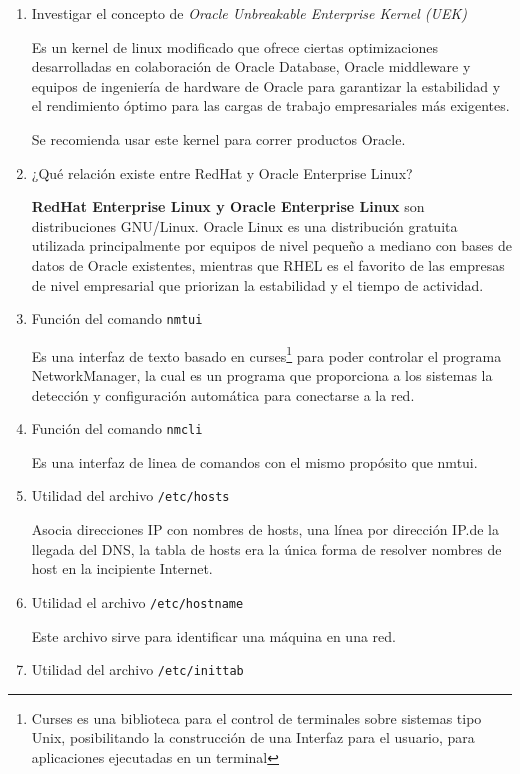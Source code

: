 \documentclass[../main.tex]{subfiles}
\begin{document}
\begin{enumerate}
  \item Investigar el concepto de \textit{Oracle Unbreakable Enterprise Kernel (UEK)}

        Es un kernel de linux modificado que ofrece ciertas optimizaciones desarrolladas
        en colaboración de Oracle Database, Oracle middleware y equipos de ingeniería de
        hardware de Oracle para garantizar la estabilidad y el rendimiento óptimo para
        las cargas de trabajo empresariales más exigentes\cite{oracle2021}.

        Se recomienda usar este kernel para correr productos Oracle.

  \item ¿Qué relación existe entre RedHat y Oracle Enterprise Linux?

        \textbf{RedHat Enterprise Linux y Oracle Enterprise Linux} son distribuciones
        GNU/Linux. Oracle Linux es una distribución gratuita utilizada principalmente
        por equipos de nivel pequeño a mediano con bases de datos de Oracle
        existentes, mientras que RHEL es el favorito de las empresas de nivel
        empresarial que priorizan la estabilidad y el tiempo de actividad.
  \item Función del comando \texttt{nmtui}

        Es una interfaz de texto basado en curses\footnote{Curses es una biblioteca para el control de terminales sobre sistemas tipo Unix, posibilitando la construcción de una Interfaz para el usuario, para aplicaciones ejecutadas en un terminal} para poder controlar el programa
        NetworkManager, la cual es un programa que proporciona a los sistemas la
        detección y configuración automática para conectarse a la red\cite{archwiki:nm}.
  \item Función del comando \texttt{nmcli}

        Es una interfaz de linea de comandos con el mismo propósito que nmtui\cite{archwiki:nm}.
  \item Utilidad del archivo \texttt{/etc/hosts}

        Asocia direcciones IP con nombres de hosts, una línea por dirección IP.\@Antes de la
        llegada del DNS, la tabla de hosts era la única forma de resolver nombres de host
        en la incipiente Internet.
  \item Utilidad el archivo \texttt{/etc/hostname}

        Este archivo sirve para identificar una máquina en una red.
  \item Utilidad del archivo \texttt{/etc/inittab}


\end{enumerate}
\end{document}
